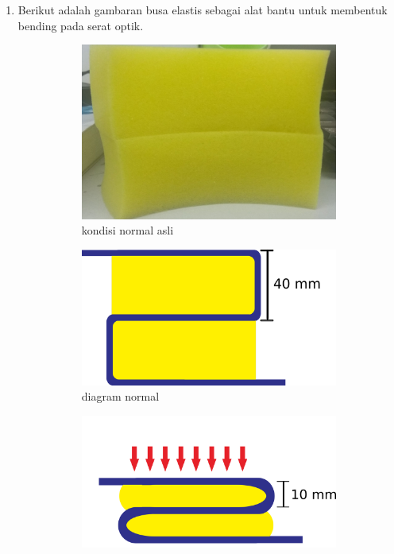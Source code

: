 \documentclass[12pt]{article}
\begin{document}
	
	\begin{enumerate}
		\item Berikut adalah gambaran busa elastis sebagai alat bantu untuk membentuk bending pada serat optik.
	
			\begin{figure}[h!]
				\centering
				\captionsetup{justification=centering}
				\begin{subfigure}[b]{0.3\textwidth}
					\includegraphics[width=\textwidth]{images/Bab_4/Bab_4_1a}	
					\caption{{\small kondisi normal asli}}		
				\end{subfigure}
				\begin{subfigure}[b]{0.3\textwidth}
					\includegraphics[width=\linewidth]{images/Bab_4/Bab_4_1b}
					\caption{{\small diagram normal}}			
				\end{subfigure}
				\begin{subfigure}[b]{0.3\textwidth}
					\includegraphics[width=\linewidth]{images/Bab_4/Bab_4_1c}

\end{subfigure}
\end{figure}
\end{enumerate}
\end{document}
